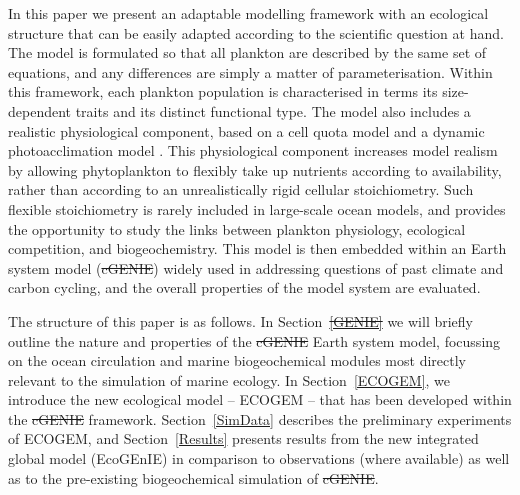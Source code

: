 \documentclass[gmd, manuscript]{copernicus}
\providecommand{\DIFadd}[1]{{\protect\color{blue}\uwave{#1}}} %
\providecommand{\DIFdel}[1]{{\protect\color{red}\sout{#1}}}                      %
\providecommand{\DIFaddbegin}{} %
\providecommand{\DIFaddend}{} %
\providecommand{\DIFdelbegin}{} %
\providecommand{\DIFdelend}{} %
\begin{document}
In this paper we present an adaptable modelling framework with an ecological structure that can be easily adapted according to the scientific question at hand. The model is formulated so that all plankton are described by the same set of equations, and any differences are simply a matter of parameterisation. Within this framework, each plankton population is characterised in terms \DIFaddbegin \DIFadd{of }\DIFaddend its size-dependent traits and its distinct functional type. The model also includes a realistic physiological component, based on a cell quota model \citep{Caperon:1968,Droop:1968} and a dynamic photoacclimation model \citep{Geider:1998}. This physiological component increases model realism by allowing phytoplankton to flexibly take up nutrients according to availability, rather than according to an unrealistically rigid cellular stoichiometry. Such flexible stoichiometry is rarely included in large-scale ocean models, and provides the opportunity to study the links between plankton physiology, ecological competition, and biogeochemistry. This model is then embedded within an Earth system model (\DIFdelbegin \DIFdel{cGENIE}\DIFdelend \DIFaddbegin \DIFadd{cGEnIE}\DIFaddend ) widely used in addressing questions of past climate and carbon cycling, and the overall properties of the model system are evaluated. 

The structure of this paper is as follows. In Section~\DIFdelbegin \DIFdel{\ref{GENIE} }\DIFdelend \DIFaddbegin \DIFadd{\ref{GEnIE} }\DIFaddend we will briefly outline the nature and properties of the \DIFdelbegin \DIFdel{cGENIE }\DIFdelend \DIFaddbegin \DIFadd{cGEnIE }\DIFaddend Earth system model, focussing on the ocean circulation and marine biogeochemical modules most directly relevant to the simulation of marine ecology. In Section~\ref{ECOGEM}, we  introduce the new ecological model -- ECOGEM -- that has been developed within the \DIFdelbegin \DIFdel{cGENIE }\DIFdelend \DIFaddbegin \DIFadd{cGEnIE }\DIFaddend framework. Section~\ref{SimData} describes the preliminary  experiments of ECOGEM, and Section~\ref{Results} presents results from the new  integrated global model (EcoGEnIE)  in comparison to observations (where available) as well as to the pre-existing biogeochemical simulation of \DIFdelbegin \DIFdel{cGENIE}\DIFdelend \DIFaddbegin \DIFadd{cGEnIE}\DIFaddend .


%
\end{document}
